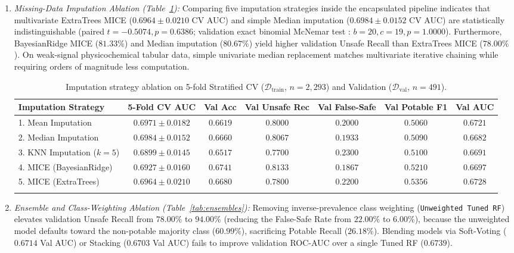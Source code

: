 \documentclass[pdflatex,sn-mathphys-num]{sn-jnl}%
\theoremstyle{thmstyleone}%
\theoremstyle{thmstyletwo}%
\theoremstyle{thmstylethree}%
\begin{document}
\begin{enumerate}
\item \textit{Missing-Data Imputation Ablation (Table~\ref{tab:imputation}):} Comparing five imputation strategies inside the encapsulated pipeline indicates that multivariate ExtraTrees MICE \cite{vanbuuren2011} ($0.6964 \pm 0.0210$ CV AUC) and simple Median imputation ($0.6984 \pm 0.0152$ CV AUC) are statistically indistinguishable (paired $t = -0.5074, p = 0.6386$; validation exact binomial McNemar test \cite{mcnemar1947}: $b = 20, c = 19, p = 1.0000$). Furthermore, BayesianRidge MICE ($81.33\%$) and Median imputation ($80.67\%$) yield higher validation Unsafe Recall than ExtraTrees MICE ($78.00\%$). On weak-signal physicochemical tabular data, simple univariate median replacement matches multivariate iterative chaining while requiring orders of magnitude less computation.

\begin{table}[t]
\caption{Imputation strategy ablation on 5-fold Stratified CV ($\mathcal{D}_{\text{train}}$, $n = 2,293$) and Validation ($\mathcal{D}_{\text{val}}$, $n = 491$).}\label{tab:imputation}%
\tiny\setlength{\tabcolsep}{1pt}
\begin{tabular*}{\textwidth}{@{\extracolsep\fill}lcccccc@{}}
\toprule
Imputation Strategy & 5-Fold CV AUC & Val Acc & Val Unsafe Rec & Val False-Safe & Val Potable F1 & Val AUC \\
\midrule
1. Mean Imputation & $0.6971 \pm 0.0182$ & $0.6619$ & $0.8000$ & $0.2000$ & $0.5060$ & $0.6721$ \\
2. Median Imputation & $\mathbf{0.6984 \pm 0.0152}$ & $0.6660$ & $0.8067$ & $0.1933$ & $0.5090$ & $0.6682$ \\
3. KNN Imputation ($k=5$) & $0.6899 \pm 0.0145$ & $0.6517$ & $0.7700$ & $0.2300$ & $0.5100$ & $0.6691$ \\
4. MICE (BayesianRidge) & $0.6927 \pm 0.0160$ & $\mathbf{0.6741}$ & $\mathbf{0.8133}$ & $\mathbf{0.1867}$ & $0.5210$ & $0.6697$ \\
5. MICE (ExtraTrees) & $0.6964 \pm 0.0210$ & $0.6680$ & $0.7800$ & $0.2200$ & $\mathbf{0.5356}$ & $\mathbf{0.6728}$ \\
\botrule
\end{tabular*}
\end{table}

\item \textit{Ensemble and Class-Weighting Ablation (Table~\ref{tab:ensembles}):} Removing inverse-prevalence class weighting (\texttt{Unweighted Tuned RF}) elevates validation Unsafe Recall from $78.00\%$ to $94.00\%$ (reducing the False-Safe Rate from $22.00\%$ to $6.00\%$), because the unweighted model defaults toward the non-potable majority class ($60.99\%$), sacrificing Potable Recall ($26.18\%$). Blending models via Soft-Voting \cite{dietterich2000} ($0.6714$ Val AUC) or Stacking \cite{wolpert1992} ($0.6703$ Val AUC) fails to improve validation ROC-AUC over a single Tuned RF ($0.6739$).


\end{enumerate}
\end{document}
